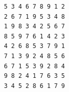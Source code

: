 \begin{Verbatim}[fontsize=\small, frame=single]
5 3 4 6 7 8 9 1 2
2 6 7 1 9 5 3 4 8
1 9 8 3 4 2 5 6 7
8 5 9 7 6 1 4 2 3
4 2 6 8 5 3 7 9 1
7 1 3 9 2 4 8 5 6
6 7 1 5 3 9 2 8 4
9 8 2 4 1 7 6 3 5
3 4 5 2 8 6 1 7 9
\end{Verbatim}
